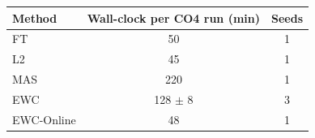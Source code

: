 \begin{tabular}{lcc}
\toprule
Method & Wall-clock per CO4 run (min) & Seeds \\
\midrule
FT & 50 & 1 \\
L2 & 45 & 1 \\
MAS & 220 & 1 \\
EWC & 128 $\pm$ 8 & 3 \\
EWC-Online & 48 & 1 \\
\bottomrule
\end{tabular}